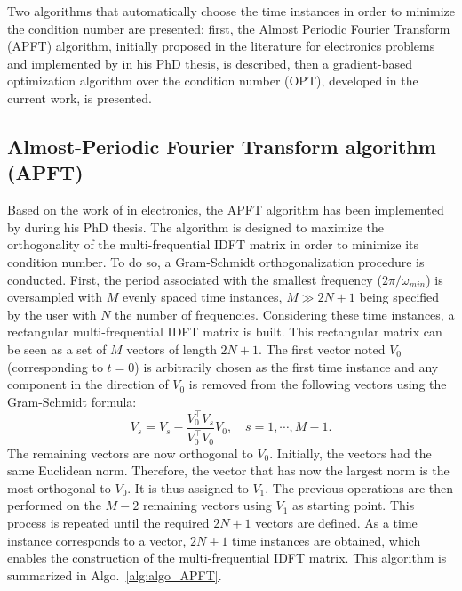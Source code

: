 
Two algorithms that automatically choose the time instances in order to
minimize the condition number are presented: first, the Almost
Periodic Fourier Transform (APFT) algorithm, initially proposed in the
literature for electronics problems and implemented by
\citet{ThesisGuedeney} in his PhD thesis, is described, then a gradient-based
optimization algorithm over the condition number (OPT), developed in
the current work, is presented.

\subsection{Almost-Periodic Fourier Transform algorithm (APFT)}
\label{sec:apft_algorithm}
Based on the work of \citet{Kundert1988} in
electronics, the APFT
algorithm has been implemented by \citet{ThesisGuedeney} 
during his PhD thesis. The algorithm is designed
to maximize the orthogonality of the multi-frequential
IDFT matrix in order to minimize its condition number. To do so, a
Gram-Schmidt orthogonalization procedure is conducted.  First, the period 
associated with the smallest frequency ($2 \pi / \omega_{min}$) 
is oversampled with $M$ evenly spaced time
instances, $M\gg2N+1$ being specified by the user with $N$ the number of
frequencies. Considering these time instances, a rectangular
multi-frequential IDFT matrix is built. This rectangular matrix can be seen
as a set of $M$ vectors of length $2N+1$.
The first vector noted $V_0$ (corresponding
to $t=0$) is arbitrarily chosen as the first time instance and any
component in the direction of $V_0$ is removed from the following
vectors using the Gram-Schmidt formula:
\begin{equation}
   V_s = V_s - \frac{V_0^\top V_s}{V_0^\top V_0} V_0, \quad s=1,\cdots,M-1.
   \label{GramSchmidtAlgo}
\end{equation}
The remaining vectors are now orthogonal to $V_0$. 
Initially, the vectors had the same Euclidean norm.
Therefore, the vector that has now the largest norm is
the most orthogonal to $V_0$.
It is thus assigned to $V_1$. The previous
operations are then performed on the $M-2$ remaining vectors using $V_1$
as starting point. This process is repeated until the required $2N+1$ vectors
are defined. As a time instance corresponds to a vector, $2N+1$ time instances are obtained, 
which enables the construction of the multi-frequential
IDFT matrix. This algorithm is summarized in
Algo.~\ref{alg:algo_APFT}.

